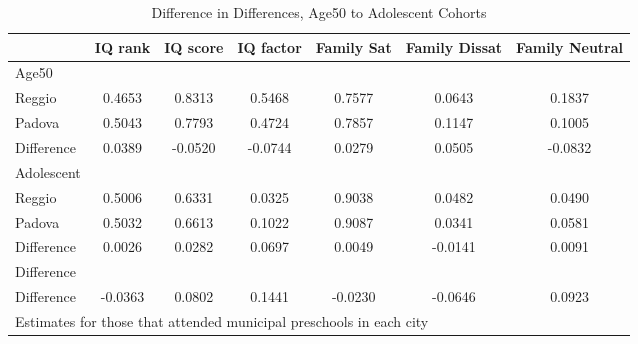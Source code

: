 \begin{table}[htbp]\centering
\caption{Difference in Differences, Age50 to Adolescent Cohorts}
\begin{tabular}{l*{6}{c}}
\hline\hline
            &     IQ rank&    IQ score&   IQ factor&  Family Sat&Family Dissat&Family Neutral\\
\hline
Age50       &            &            &            &            &            &            \\
Reggio      &      0.4653&      0.8313&      0.5468&      0.7577&      0.0643&      0.1837\\
Padova      &      0.5043&      0.7793&      0.4724&      0.7857&      0.1147&      0.1005\\
Difference  &      0.0389&     -0.0520&     -0.0744&      0.0279&      0.0505&     -0.0832\\
\hline
Adolescent  &            &            &            &            &            &            \\
Reggio      &      0.5006&      0.6331&      0.0325&      0.9038&      0.0482&      0.0490\\
Padova      &      0.5032&      0.6613&      0.1022&      0.9087&      0.0341&      0.0581\\
Difference  &      0.0026&      0.0282&      0.0697&      0.0049&     -0.0141&      0.0091\\
\hline
Difference  &            &            &            &            &            &            \\
Difference  &     -0.0363&      0.0802&      0.1441&     -0.0230&     -0.0646&      0.0923\\
\hline\hline
\multicolumn{7}{l}{\footnotesize Estimates for those that attended municipal preschools in each city}\\
\end{tabular}
\end{table}
